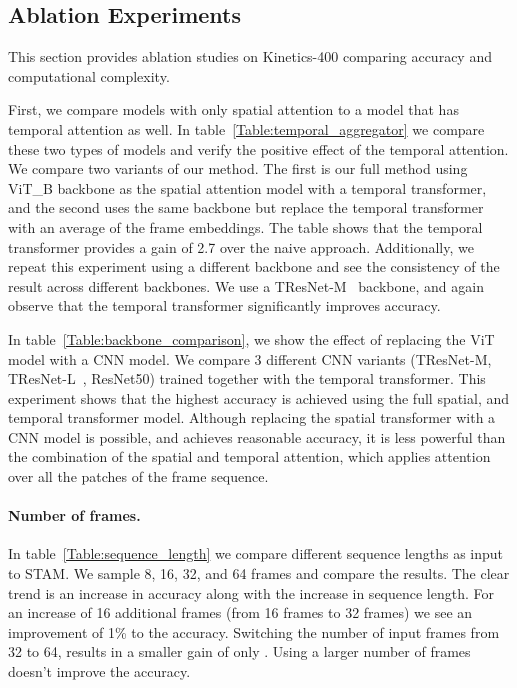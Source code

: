 \documentclass[10pt,twocolumn,letterpaper]{article}
\begin{document}
\subsection{Ablation Experiments}
This section provides ablation studies on Kinetics-400
comparing accuracy and computational complexity.

First, we compare models with only spatial attention to a model that has temporal attention as well. In table~\ref{Table:temporal_aggregator} we compare these two types of models and verify the positive effect of the temporal attention.  We compare two variants of our method. The first is our full method using ViT\_B backbone as the spatial attention model  with a temporal transformer, and the second uses the same backbone but replace the temporal transformer with an average of the frame embeddings. The table shows that the temporal transformer provides a gain of 2.7 over the naive approach. Additionally, we repeat this experiment using a different backbone and see the consistency of the result across different backbones.  We use a TResNet-M~\cite{Ridnik_2021_WACV} backbone, and again observe that the temporal transformer significantly improves accuracy. 


In table~\ref{Table:backbone_comparison}, we show the effect of replacing the ViT model with a CNN model. We compare 3 different CNN variants (TResNet-M, TResNet-L~\cite{Ridnik_2021_WACV}, ResNet50) trained together with the temporal transformer. This experiment shows that the highest accuracy is achieved using the full spatial, and temporal transformer model. Although replacing the spatial transformer with a CNN model is possible, and achieves reasonable accuracy, it is less powerful than the combination of the spatial and temporal attention, which applies attention over all the patches of the frame sequence. 


\paragraph{Number of frames.} In table~\ref{Table:sequence_length} we compare different sequence lengths as input to STAM. We sample 8, 16, 32, and 64 frames and compare the results.  The clear trend is an increase in accuracy along with the increase in sequence length.  For an increase of 16 additional frames (from 16 frames to 32 frames) we see an improvement of 1\% to the accuracy.  Switching the number of input frames from 32 to 64, results in a smaller gain of only . Using a larger number of frames doesn't improve the accuracy. 
\end{document}
